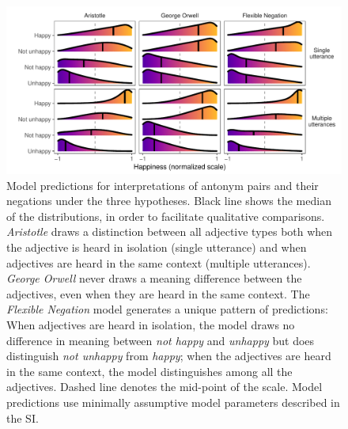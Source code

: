 \documentclass[floatsintext,doc]{apa6}
\newcommand{\ourmodel}{Flexible Negation\xspace}
\begin{document}
\begin{figure}[h!]
\centering \includegraphics[width=\textwidth]{figs/alternativeModels_dists4.pdf} 
\caption{\small Model predictions for interpretations of antonym pairs and their negations under the three hypotheses. Black line shows the median of the distributions, in order to facilitate qualitative comparisons. \emph{Aristotle} draws a distinction between all adjective types both when the adjective is heard in isolation (single utterance) and when adjectives are heard in the same context (multiple utterances). \emph{George Orwell} never draws a meaning difference between the adjectives, even when they are heard in the same context. The \emph{\ourmodel} model generates a unique pattern of predictions:  When adjectives are heard in isolation, the model draws no difference in meaning between \emph{not happy} and \emph{unhappy} but does distinguish \emph{not unhappy} from \emph{happy}; when the adjectives are heard in the same context, the model distinguishes among all the adjectives. Dashed line denotes the mid-point of the scale. Model predictions use minimally assumptive model parameters described in the SI.}
\label{fig:modelPredictions}
\end{figure}

 

\end{document}
